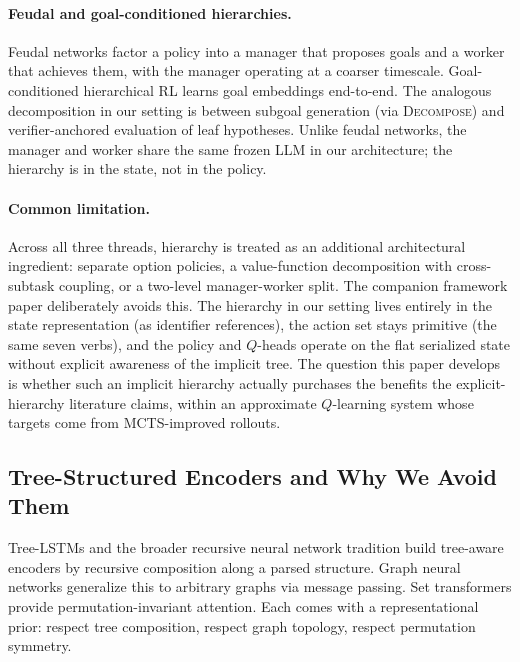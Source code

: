 \paragraph{Feudal and goal-conditioned hierarchies.}
Feudal networks \citep{vezhnevets2017feudal} factor a policy into a
manager that proposes goals and a worker that achieves them, with the
manager operating at a coarser timescale. Goal-conditioned hierarchical
RL \citep{nachum2018data} learns goal embeddings end-to-end. The
analogous decomposition in our setting is between subgoal generation
(via \textsc{Decompose}) and verifier-anchored evaluation of leaf
hypotheses. Unlike feudal networks, the manager and worker share the
same frozen LLM in our architecture; the hierarchy is in the state, not
in the policy.

\paragraph{Common limitation.}
Across all three threads, hierarchy is treated as an additional
architectural ingredient: separate option policies, a value-function
decomposition with cross-subtask coupling, or a two-level
manager-worker split. The companion framework paper deliberately avoids
this. The hierarchy in our setting lives entirely in the state
representation (as identifier references), the action set stays
primitive (the same seven verbs), and the policy and $Q$-heads operate
on the flat serialized state without explicit awareness of the implicit
tree. The question this paper develops is whether such an implicit
hierarchy actually purchases the benefits the explicit-hierarchy
literature claims, within an approximate $Q$-learning system whose
targets come from MCTS-improved rollouts.

\subsection{Tree-Structured Encoders and Why We Avoid Them}
\label{sec:background-trees}

Tree-LSTMs \citep{tai2015improved} and the broader recursive neural
network tradition \citep{socher2013recursive} build tree-aware encoders
by recursive composition along a parsed structure. Graph neural networks
\citep{velickovic2018gat} generalize this to arbitrary graphs via
message passing. Set transformers \citep{lee2019set} provide
permutation-invariant attention. Each comes with a representational
prior: respect tree composition, respect graph topology, respect
permutation symmetry.

